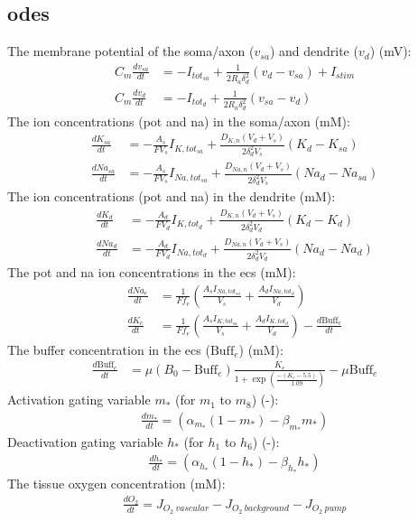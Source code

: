 \documentclass[11pt]{elsarticle}
\newcommand{\na}{\gls{na}\xspace}
\newcommand{\pot}{\gls{pot}\xspace}
\newcommand{\cl}{\gls{cl}\xspace}
\begin{document}
\subsection{\Glspl{ode}}
The membrane potential of the soma/axon ($v_{sa}$) and dendrite ($v_d$) (mV):
	\begin{align}
	C_{m}\frac{d v_{sa}}{d t} 	&= -I_{tot_{sa}}+\frac{1}{2R_a\delta_d^{2}}(v_d-v_{sa})+I_{stim} \\
	C_{m}\frac{d v_d}{d t} 		&= -I_{tot_d}+\frac{1}{2R_a\delta_d^{2}}(v_{sa}-v_d)
	\end{align}
%	
The ion concentrations (\pot and \na) in the soma/axon (mM):
	\begin{align} 
	\frac{d K_{sa}}{dt} &= -\frac{A_s}{F V_s} I_{K,tot_{sa}} + \frac{D_{K,n}(V_d + V_s)} {2 \delta_d^2 V_s} (K_d - K_{sa}) \\
	\frac{d Na_{sa}}{dt} &= -\frac{A_s}{F V_s} I_{Na,tot_{sa}} + \frac{D_{Na,n}(V_d + V_s)} {2 \delta_d^2 V_s} (Na_d - Na_{sa})
	\end{align}
%
The ion concentrations (\pot and \na) in the dendrite (mM):
	\begin{align} 
	\frac{d K_{d}}{dt} &= -\frac{A_d}{F V_d} I_{K,tot_{d}} + \frac{D_{K,n}(V_d + V_s)} {2 \delta_d^2 V_d} (K_d - K_{d}) \\
	\frac{d Na_{d}}{dt} &= -\frac{A_d}{F V_d} I_{Na,tot_{d}} + \frac{D_{Na, n}(V_d + V_s)} {2 \delta_d^2 V_d} (Na_d - Na_{d})
	\end{align}
%
The \pot and \na ion concentrations in the \gls{ecs} (mM):	
	\begin{align}
	\frac{d Na_e}{dt} &= \frac{1}{F f_e} \left( \frac{A_s I_{Na,tot_{sa}}}{V_s} + \frac{A_d I_{Na,tot_d}}{V_d} \right) \\
	\frac{d K_e}{dt} &= \frac{1}{F f_e} \left( \frac{A_s I_{K,tot_{sa}}}{V_s} + \frac{A_d I_{K,tot_d}}{V_d} \right) - \frac{d \text{Buff}_e}{dt}
	\end{align}	
%
%
The buffer concentration in the \gls{ecs} ($\text{Buff}_e$) (mM):
	\begin{align}
	\frac{d\text{Buff}_e}{dt} &= \mu (B_0 - \text{Buff}_e) \frac{K_e}{1 + \exp\left( \frac{-(K_e - 5.5)}{1.09} \right)} - \mu \text{Buff}_e
	\end{align}
%
Activation gating variable $m_*$ (for $m_1$ to $m_8$) (-):
	\begin{align}
	\frac{d m_*}{dt} = \left( \alpha_{m_*} (1-m_*) - \beta_{m_*} m_*  \right)
	\end{align}
%	
Deactivation gating variable $h_*$ (for $h_1$ to $h_6$) (-):
	\begin{align}
	\frac{d h_*}{dt} =  \left( \alpha_{h_*} (1-h_*) - \beta_{h_*} h_*  \right)
	\end{align}
The tissue oxygen concentration (mM):	
	\begin{align}
	\frac{d O_2}{dt} = J_{O_2 \: vascular} - J_{O_2 \: background} - J_{O_2 \: pump}
	\end{align}
%
\end{document}
